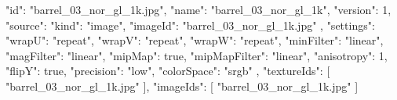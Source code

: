 {
  "id": "barrel_03_nor_gl_1k.jpg",
  "name": "barrel_03_nor_gl_1k",
  "version": 1,
  "source": {
    "kind": "image",
    "imageId": "barrel_03_nor_gl_1k.jpg"
  },
  "settings": {
    "wrapU": "repeat",
    "wrapV": "repeat",
    "wrapW": "repeat",
    "minFilter": "linear",
    "magFilter": "linear",
    "mipMap": true,
    "mipMapFilter": "linear",
    "anisotropy": 1,
    "flipY": true,
    "precision": "low",
    "colorSpace": "srgb"
  },
  "textureIds": [
    "barrel_03_nor_gl_1k.jpg"
  ],
  "imageIds": [
    "barrel_03_nor_gl_1k.jpg"
  ]
}
